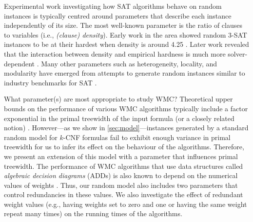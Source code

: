 Experimental work investigating how SAT algorithms behave on random instances is
typically centred around parameters that describe each instance independently of
its size. The most well-known parameter is the ratio of clauses to variables
(i.e., \emph{(clause) density}). Early work in the area showed random 3-SAT
instances to be at their hardest when density is around 4.25
\citep{DBLP:conf/aaai/MitchellSL92}. Later work revealed that the interaction
between density and empirical hardness is much more solver-dependent
\citep{DBLP:journals/constraints/CoarfaDASV03}. Many other parameters such as
heterogeneity, locality, and modularity have emerged from attempts to generate
random instances similar to industry benchmarks for SAT
\citep{DBLP:conf/ijcai/AnsoteguiBL09,DBLP:conf/tacas/BlasiusFS19,DBLP:journals/ai/Giraldez-CruL16,DBLP:conf/ijcai/Giraldez-CruL17}.

What parameter(s) are most appropriate to study WMC\@? Theoretical upper bounds
on the performance of various WMC algorithms typically include a factor
exponential in the primal treewidth of the input formula (or a closely related
notion)
\citep{DBLP:journals/jair/BacchusDP09,DBLP:journals/jacm/Darwiche01,DBLP:conf/ecai/Darwiche04,DBLP:conf/sat/SangBBKP04}.
However---as we show in \cref{sec:model}---instances generated by a standard
random model for $k$-CNF formulas fail to exhibit enough variance in primal
treewidth for us to infer its effect on the behaviour of the algorithms.
Therefore, we present an extension of this model with a parameter that
influences primal treewidth. The performance of WMC algorithms that use data
structures called \emph{algebraic decision diagrams} (ADDs)
\citep{DBLP:journals/fmsd/BaharFGHMPS97} is also known to depend on the
numerical values of weights
\citep{DBLP:conf/aaai/DudekPV20,DBLP:conf/cp/DudekPV20}. Thus, our random model
also includes two parameters that control redundancies in these values. We also
investigate the effect of redundant weight values (e.g., having weights set to
zero and one or having the same weight repeat many times) on the running times
of the algorithms.

